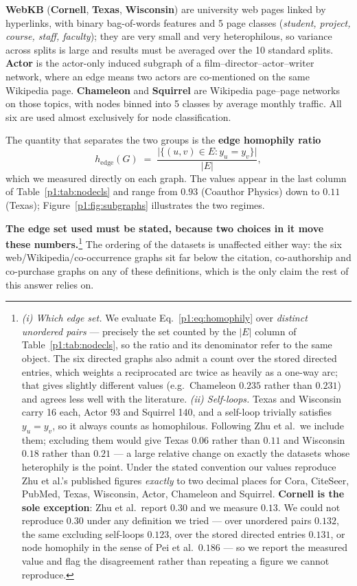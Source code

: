 \textbf{WebKB} (\textbf{Cornell}, \textbf{Texas}, \textbf{Wisconsin}) are university web
pages linked by hyperlinks, with binary bag-of-words features and 5 page classes
(\emph{student, project, course, staff, faculty}); they are very small and very
heterophilous, so variance across splits is large and results must be averaged over the 10
standard splits. \textbf{Actor} is the actor-only induced subgraph of a
film--director--actor--writer network, where an edge means two actors are co-mentioned on
the same Wikipedia page. \textbf{Chameleon} and \textbf{Squirrel} are Wikipedia page--page
networks on those topics, with nodes binned into 5 classes by average monthly traffic. All
six are used almost exclusively for node classification.

\noindent
The quantity that separates the two groups is the \textbf{edge homophily ratio}
\begin{equation}
  h_{\mathrm{edge}}(G) \;=\; \frac{\bigl|\{(u,v)\in E : y_u = y_v\}\bigr|}{|E|},
  \label{p1:eq:homophily}
\end{equation}
which we measured directly on each graph. The values appear in the last column of
Table~\ref{p1:tab:nodecls} and range from $0.93$ (Coauthor Physics) down to $0.11$ (Texas);
Figure~\ref{p1:fig:subgraphs} illustrates the two regimes.

\noindent
\textbf{The edge set used must be stated, because two choices in it move these
numbers.}\footnote{%
\label{p1:fn:cornell}%
\emph{(i) Which edge set.} We evaluate Eq.~\eqref{p1:eq:homophily} over \emph{distinct
unordered pairs} --- precisely the set counted by the $|E|$ column of
Table~\ref{p1:tab:nodecls}, so the ratio and its denominator refer to the same object. The
six directed graphs also admit a count over the stored directed entries, which weights a
reciprocated arc twice as heavily as a one-way arc; that gives slightly different values
(e.g.\ Chameleon $0.235$ rather than $0.231$) and agrees less well with the literature.
\emph{(ii) Self-loops.} Texas and Wisconsin carry 16 each, Actor 93 and Squirrel 140, and a
self-loop trivially satisfies $y_u=y_v$, so it always counts as homophilous. Following Zhu
et al.\ we include them; excluding them would give Texas $0.06$ rather than $0.11$ and
Wisconsin $0.18$ rather than $0.21$ --- a large relative change on exactly the datasets
whose heterophily is the point. Under the stated convention our values reproduce Zhu et
al.'s published figures \emph{exactly} to two decimal places for Cora, CiteSeer, PubMed,
Texas, Wisconsin, Actor, Chameleon and Squirrel. \textbf{Cornell is the sole exception}:
Zhu et al.\ report $0.30$ and we measure $0.13$. We could not reproduce $0.30$ under any
definition we tried --- over unordered pairs $0.132$, the same excluding self-loops
$0.123$, over the stored directed entries $0.131$, or node homophily in the sense of Pei et
al.\ $0.186$ --- so we report the measured value and flag the disagreement rather than
repeating a figure we cannot reproduce.}
The ordering of the datasets is unaffected either way: the six web/Wikipedia/co-occurrence
graphs sit far below the citation, co-authorship and co-purchase graphs on any of these
definitions, which is the only claim the rest of this answer relies on.

